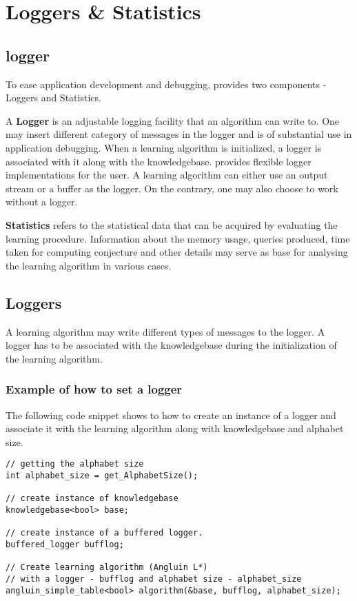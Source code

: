 \chapter{Loggers \& Statistics}
\section{logger}

To ease application development and debugging, \libalf provides two components - Loggers and Statistics. 

A \textbf{Logger} is an adjustable logging facility that an algorithm can write to. One may insert different category of messages in the logger and is of substantial use in application debugging. When a learning algorithm is initialized, a logger is associated with it along with the knowledgebase. \libalf provides flexible logger implementations for the user. A learning algorithm can either use an output stream or a buffer as the logger. On the contrary, one may also choose to work without a logger.

\textbf{Statistics} refers to the statistical data that can be acquired by evaluating the learning procedure. Information about the memory usage, queries produced, time taken for computing conjecture and other details may serve as base for analysing the learning algorithm in various cases. 

\section{Loggers}

A learning algorithm may write different types of messages to the logger. A logger has to be associated with the knowledgebase during the initialization of the learning algorithm. 

\subsection*{Example of how to set a logger}
The following code snippet shows to how to create an instance of a logger and associate it with the learning algorithm along with knowledgebase and alphabet size.
\begin{lstlisting}
// getting the alphabet size
int alphabet_size = get_AlphabetSize(); 

// create instance of knowledgebase
knowledgebase<bool> base; 

// create instance of a buffered logger.
buffered_logger bufflog; 

// Create learning algorithm (Angluin L*) 
// with a logger - bufflog and alphabet size - alphabet_size
angluin_simple_table<bool> algorithm(&base, bufflog, alphabet_size); 
\end{lstlisting}

